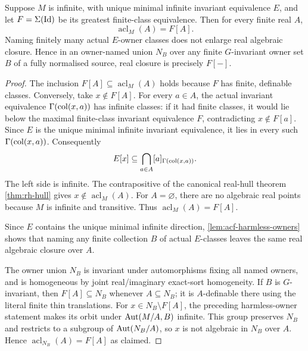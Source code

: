 
\begin{lemma}
\label{lem:consolidated-unary-closure}
Suppose $M$ is infinite, with unique minimal infinite invariant
equivalence $E$, and let $F=\Sigma(\mathrm{Id})$ be its greatest finite-class
equivalence.  Then for every finite real $A$,
\[
                  \operatorname{acl}_M(A)=F[A].
\]
Naming finitely many actual $E$-owner classes does not enlarge
real algebraic closure.  Hence in an owner-named union $N_B$
over any finite $G$-invariant owner set $B$ of a fully normalised
source, real closure is precisely $F[-]$.
\end{lemma}
\begin{proof}
The inclusion $F[A]\subseteq\operatorname{acl}_M(A)$ holds
because $F$ has finite, definable classes.  Conversely, take
$x\notin F[A]$.  For every $a\in A$, the actual invariant
equivalence $\Gamma(\operatorname{col}(x,a))$ has infinite classes: if it
had finite classes, it would lie below the maximal finite-class
invariant equivalence $F$, contradicting $x\notin F[a]$.
Since $E$ is the unique minimal infinite invariant equivalence,
it lies in every such $\Gamma(\operatorname{col}(x,a))$.  Consequently
\[
 E[x]\subseteq
 \bigcap_{a\in A}[a]_{\Gamma(\operatorname{col}(x,a))}.
\]
The left side is infinite.  The contrapositive of the
canonical real-hull theorem \cref{thm:rh-hull} gives
$x\notin\operatorname{acl}_M(A)$.  For $A=\varnothing$,
there are no algebraic real points because $M$ is infinite and
transitive.  Thus $\operatorname{acl}_M(A)=F[A]$.

Since $E$ contains the unique minimal infinite direction,
\cref{lem:acf-harmless-owners} shows that naming any finite
collection $B$ of actual $E$-classes leaves the same real
algebraic closure over $A$.

The owner union $N_B$ is invariant under automorphisms fixing
all named owners, and is homogeneous by joint real/imaginary
exact-sort homogeneity.  If $B$ is $G$-invariant, then
$F[A]\subseteq N_B$ whenever $A\subseteq N_B$; it is
$A$-definable there using the literal finite thin translations.
For $x\in N_B\setminus F[A]$, the preceding harmless-owner
statement makes its orbit under $\operatorname{Aut}(M/A,B)$ infinite.
This group preserves $N_B$ and restricts to a subgroup of
$\operatorname{Aut}(N_B/A)$, so $x$ is not algebraic in $N_B$ over $A$.
Hence $\operatorname{acl}_{N_B}(A)=F[A]$ as claimed.
\end{proof}

